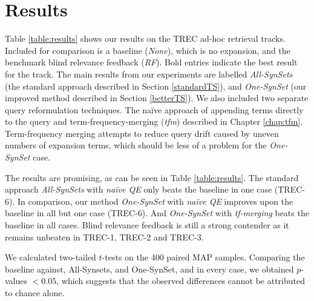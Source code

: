 \section{Results}
Table \ref{table:results} shows our results on the TREC ad-hoc retrieval tracks. Included for comparison is a baseline (\textit{None}), which is no expansion, and the benchmark blind relevance feedback (\textit{RF}). Bold entries indicate the best result for the track. The main results from our experiments are labelled \textit{All-SynSets} (the standard approach described in Section \ref{standardTS}), and \textit{One-SynSet} (our improved method described in Section \ref{betterTS}). We also included two separate query reformulation techniques. The na{\"i}ve approach of appending terms directly to the query and term-frequency-merging (\textit{tfm}) \cite{Crimp:2017:ATR:3166072.3166074} described in Chapter \ref{chap:tfm}. Term-frequency merging attempts to reduce query drift caused by uneven numbers of expansion terms, which should be less of a problem for the \textit{One-SynSet} case.

The results are promising, as can be seen in Table \ref{table:results}. The standard approach \textit{All-SynSets} with \textit{na{\"i}ve QE} only beats the baseline in one case (TREC-6). In comparison, our method \textit{One-SynSet} with \textit{na{\"i}ve QE} improves upon the baseline in all but one case (TREC-6). And \textit{One-SynSet} with \textit{tf-merging} beats the baseline in all cases. Blind relevance feedback is still a strong contender as it remains unbeaten in TREC-1, TREC-2 and TREC-3.


We calculated two-tailed $t$-tests on the 400 paired MAP samples. Comparing the baseline against, All-Synsets, and One-SynSet, and in every case, we obtained $p$-values $< 0.05$, which suggests that the observed differences cannot be attributed to chance alone.





